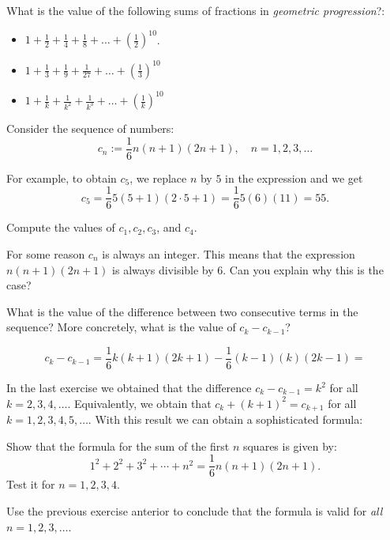\begin{exercise}
What is the value of the following sums of fractions in \emph{geometric progression}?:
\begin{itemize} 
    \item $1+\frac{1}{2}+\frac{1}{4}+\frac{1}{8}+\dots +\left(\frac{1}{2}\right)^{10}$.
    \item $1+\frac{1}{3}+\frac{1}{9}+\frac{1}{27}+\dots+\left(\frac{1}{3}\right)^{10}$
    \item $1+\frac{1}{k}+\frac{1}{k^2}+\frac{1}{k^3}+\dots+\left(\frac{1}{k}\right)^{10}$
    \end{itemize}
\end{exercise}
\tutpagebreak

Consider the sequence of numbers: $$c_n:=\frac{1}{6}n(n+1)(2n+1), \quad n=1,2,3,\dots $$

For example, to obtain $c_5$, we replace $n$ by $5$ in the expression and we get 
$$c_5 = \frac{1}{6}5(5+1)(2\cdot5+1) = \frac{1}{6}5(6)(11) = 55.$$ 

\begin{exercise} 
Compute the values of $c_1,c_2,c_3$, and $c_4$.
\end{exercise}

\begin{exercise} 
For some reason $c_n$ is always an integer. 
This means that the expression $n(n+1)(2n+1)$ is always divisible by $6$. 
Can you explain why this is the case?
\end{exercise}

\begin{exercise} 
What is the value of the difference between two consecutive terms in the sequence? 
More concretely, what is the value of $c_k-c_{k-1}$?
\end{exercise}
$$c_k-c_{k-1} = \frac{1}{6}k(k+1)(2k+1)-\frac{1}{6}(k-1)(k)(2k-1) = $$
\tutpagebreak

In the last exercise we obtained that the difference $c_k-c_{k-1} = k^2$ for all $k=2,3,4,\dots$. 
Equivalently, we obtain that $c_{k}+(k+1)^2=c_{k+1}$ for all $k=1,2,3,4,5,\dots$. 
With this result we can obtain a sophisticated formula:
\begin{exercise}
Show that the formula for the sum of the first $n$ squares is given by: 
$$1^2+2^2+3^2+\cdots+n^2=\frac{1}{6}n(n+1)(2n+1).$$ 
Test it for $n=1,2,3,4$.

Use the previous exercise anterior to conclude that the formula is valid for \emph{all} $n=1,2,3, \dots$.
\end{exercise}
\tutpagebreak

